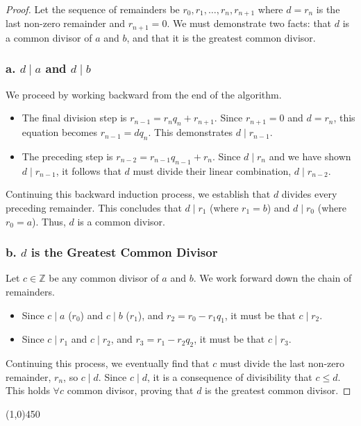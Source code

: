 \begin{proof}
Let the sequence of remainders be $r_0, r_1, \dots, r_n, r_{n+1}$ where $d = r_n$ is the last non-zero remainder and $r_{n+1} = 0$. We must demonstrate two facts: that $d$ is a common divisor of $a$ and $b$, and that it is the greatest common divisor.

\subsubsection*{a. $d \mid a$ and $d \mid b$}
We proceed by working backward from the end of the algorithm.
\begin{itemize}
    \item The final division step is $r_{n-1} = r_n q_n + r_{n+1}$. Since $r_{n+1} = 0$ and $d = r_n$, this equation becomes $r_{n-1} = d q_n$. This demonstrates $d \mid r_{n-1}$.
    \item The preceding step is $r_{n-2} = r_{n-1} q_{n-1} + r_n$. Since $d \mid r_n$ and we have shown $d \mid r_{n-1}$, it follows that $d$ must divide their linear combination, $d \mid r_{n-2}$.
\end{itemize}
Continuing this backward induction process, we establish that $d$ divides every preceding remainder. This concludes that $d \mid r_1$ (where $r_1 = b$) and $d \mid r_0$ (where $r_0 = a$). Thus, $d$ is a common divisor.

\subsubsection*{b. $d$ is the Greatest Common Divisor}
Let $c \in \mathbb{Z}$ be any common divisor of $a$ and $b$. We work forward down the chain of remainders.
\begin{itemize}
    \item Since $c \mid a$ ($r_0$) and $c \mid b$ ($r_1$), and $r_2 = r_0 - r_1q_1$, it must be that $c \mid r_2$.
    \item Since $c \mid r_1$ and $c \mid r_2$, and $r_3 = r_1 - r_2q_2$, it must be that $c \mid r_3$.
\end{itemize}
Continuing this process, we eventually find that $c$ must divide the last non-zero remainder, $r_n$, so $c \mid d$.
Since $c \mid d$, it is a consequence of divisibility that $c \leq d$. This holds $\forall c$ common divisor, proving that $d$ is the greatest common divisor. \qedhere
\end{proof}

\begin{center}
    \vspace{10pt}
    \line(1,0){450}
    \vspace{25pt}
\end{center}

